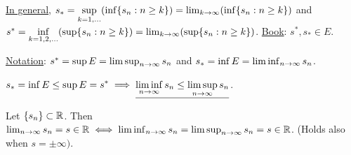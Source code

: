 \documentclass[]{article}
\begin{document}
\newpage

\ul{In general}, $s_* = \underset{k=1,\dots}{\sup}(\inf\{s_n:n\geq k\}) = \lim_{k\rightarrow\infty}(\inf\{s_n:n\geq k\})$ and $s^* = \underset{k=1,2,\dots}{\inf}(\sup\{s_n:n\geq k\}) = \lim_{k\rightarrow\infty}(\sup\{s_n:n\geq k\})$.
\ul{Book}: $s^*,s_*\in E$.

\ul{Notation}: $s^* = \sup E = \limsup_{n\rightarrow\infty} s_n$ and $s_* = \inf E = \liminf_{n\rightarrow\infty} s_n$.

\begin{note}
	$\displaystyle s_* = \inf E\leq \sup E = s^* \implies \underline{\liminf_{n\rightarrow\infty} s_n\leq \limsup_{n\rightarrow\infty} s_n}$.
\end{note}

\begin{theorem}
	Let $\{s_n\}\subset\mathbb{R}$. Then $\lim_{n\rightarrow\infty} s_n = s\in\mathbb{R} \iff \liminf_{n\rightarrow\infty} s_n = \limsup_{n\rightarrow\infty} s_n = s\in\mathbb{R}$. (Holds also when $s = \pm\infty)$.
\end{theorem}
\end{document}
